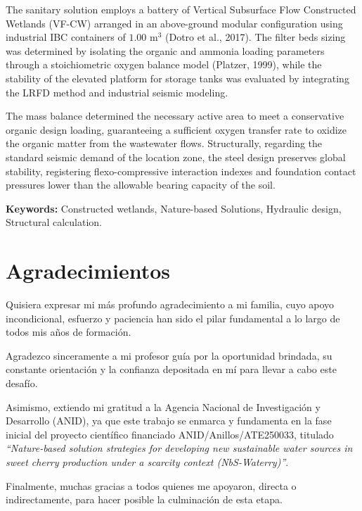\documentclass[12pt, letterpaper]{report}
\begin{document}
The sanitary solution employs a battery of Vertical Subsurface Flow Constructed Wetlands (VF-CW) arranged in an above-ground modular configuration using industrial IBC containers of $1.00\text{ m}^3$ (Dotro et al., 2017). The filter beds sizing was determined by isolating the organic and ammonia loading parameters through a stoichiometric oxygen balance model (Platzer, 1999), while the stability of the elevated platform for storage tanks was evaluated by integrating the LRFD method and industrial seismic modeling.

The mass balance determined the necessary active area to meet a conservative organic design loading, guaranteeing a sufficient oxygen transfer rate to oxidize the organic matter from the wastewater flows. Structurally, regarding the standard seismic demand of the location zone, the steel design preserves global stability, registering flexo-compressive interaction indexes and foundation contact pressures lower than the allowable bearing capacity of the soil.

\vspace{0.5cm}
\noindent\textbf{Keywords:} Constructed wetlands, Nature-based Solutions, Hydraulic design, Structural calculation.

\newpage

\chapter*{Agradecimientos}

Quisiera expresar mi más profundo agradecimiento a mi familia, cuyo apoyo incondicional, esfuerzo y paciencia han sido el pilar fundamental a lo largo de todos mis años de formación. 

Agradezco sinceramente a mi profesor guía por la oportunidad brindada, su constante orientación y la confianza depositada en mí para llevar a cabo este desafío. 

Asimismo, extiendo mi gratitud a la Agencia Nacional de Investigación y Desarrollo (ANID), ya que este trabajo se enmarca y fundamenta en la fase inicial del proyecto científico financiado ANID/Anillos/ATE250033, titulado \textit{``Nature-based solution strategies for developing new sustainable water sources in sweet cherry production under a scarcity context (NbS-Waterry)''}. 

Finalmente, muchas gracias a todos quienes me apoyaron, directa o indirectamente, para hacer posible la culminación de esta etapa.
\end{document}
